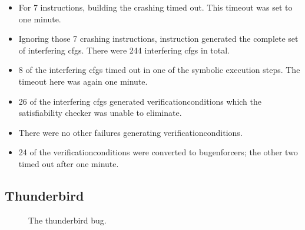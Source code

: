 \begin{itemize}
\item For 7 instructions, building the crashing {\StateMachine} timed
  out.  This timeout was set to one minute.
\item Ignoring those 7 crashing instructions, instruction generated
  the complete set of interfering \glspl{cfg}.  There were 244
  interfering \glspl{cfg} in total.
\item 8 of the interfering \glspl{cfg} timed out in one of the
  symbolic execution steps.  The timeout here was again one minute.
\item 26 of the interfering \glspl{cfg} generated
  \glspl{verificationcondition} which the satisfiability checker was
  unable to eliminate.
\item There were no other failures generating
  \glspl{verificationcondition}.
\item 24 of the \glspl{verificationcondition} were converted to
  \glspl{bugenforcer}; the other two timed out after one minute.
\end{itemize}



    
  
  

\subsection{Thunderbird}

\begin{figure}
  \caption{The thunderbird bug.}
  \label{fig:eval:thunderbird}
\end{figure}

